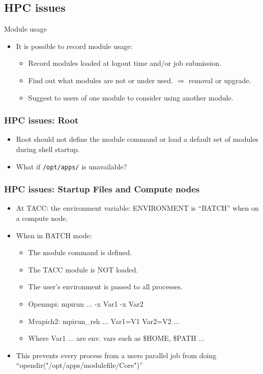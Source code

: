 \documentclass{beamer}
\begin{document}
\subsection{HPC issues}

\begin{frame}{Module usage}
  \begin{itemize}
    \item It is possible to record module usage:
      \begin{itemize}
        \item Record modules loaded at logout time and/or job submission.
        \item Find out what modules are not or under used.
          $\Rightarrow$ removal or upgrade.
        \item Suggest to users of one module to consider using another module.
      \end{itemize}
  \end{itemize}
\end{frame}



\begin{frame}[fragile]
    \frametitle{HPC issues: Root}
  \begin{itemize}
    \item Root should not define the module command or load a default
      set of modules during shell startup.
    \item What if \texttt{/opt/apps/} is unavailable?

  \end{itemize}
\end{frame}

\begin{frame}[fragile]
    \frametitle{HPC issues: Startup Files and Compute nodes}
  \begin{itemize}
    \item At TACC: the environment variable: ENVIRONMENT is ``BATCH'' when on a compute node.
    \item When in BATCH mode:
      \begin{itemize}
        \item The module command is defined.
        \item The TACC module is NOT loaded.
        \item The user's environment is passed to all processes.
        \item Openmpi: mpirun ... -x {\color{blue}Var1} -x {\color{blue}Var2}
        \item Mvapich2: mpirun\_rsh ... {\color{blue}Var1}={\color{blue}V1} {\color{blue}Var2}={\color{blue}V2} ...
        \item Where {\color{blue}Var1} ... are env. vars such as
          \$HOME, \$PATH ...
      \end{itemize}
    \item This prevents every process from a users parallel job from
      doing ``opendir("/opt/apps/modulefile/Core")''
  \end{itemize}
\end{frame}
\end{document}
